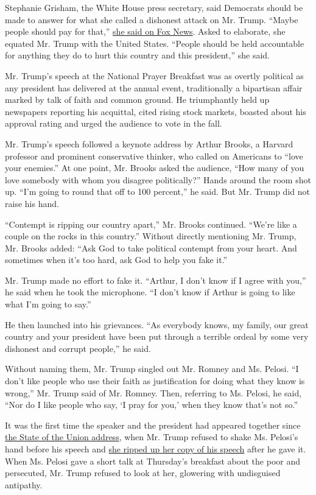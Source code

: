 Stephanie Grisham, the White House press secretary, said Democrats
should be made to answer for what she called a dishonest attack on Mr.
Trump. ``Maybe people should pay for that,''
\href{https://www.foxnews.com/media/stephanie-grisham-dems-must-be-held-accountable-for-corrupt-impeachment}{she
said on Fox News}. Asked to elaborate, she equated Mr. Trump with the
United States. ``People should be held accountable for anything they do
to hurt this country and this president,'' she said.

Mr. Trump's speech at the National Prayer Breakfast was as overtly
political as any president has delivered at the annual event,
traditionally a bipartisan affair marked by talk of faith and common
ground. He triumphantly held up newspapers reporting his acquittal,
cited rising stock markets, boasted about his approval rating and urged
the audience to vote in the fall.

Mr. Trump's speech followed a keynote address by Arthur Brooks, a
Harvard professor and prominent conservative thinker, who called on
Americans to ``love your enemies.'' At one point, Mr. Brooks asked the
audience, ``How many of you love somebody with whom you disagree
politically?'' Hands around the room shot up. ``I'm going to round that
off to 100 percent,'' he said. But Mr. Trump did not raise his hand.

``Contempt is ripping our country apart,'' Mr. Brooks continued. ``We're
like a couple on the rocks in this country.'' Without directly
mentioning Mr. Trump, Mr. Brooks added: ``Ask God to take political
contempt from your heart. And sometimes when it's too hard, ask God to
help you fake it.''

Mr. Trump made no effort to fake it. ``Arthur, I don't know if I agree
with you,'' he said when he took the microphone. ``I don't know if
Arthur is going to like what I'm going to say.''

He then launched into his grievances. ``As everybody knows, my family,
our great country and your president have been put through a terrible
ordeal by some very dishonest and corrupt people,'' he said.

Without naming them, Mr. Trump singled out Mr. Romney and Ms. Pelosi.
``I don't like people who use their faith as justification for doing
what they know is wrong,'' Mr. Trump said of Mr. Romney. Then, referring
to Ms. Pelosi, he said, ``Nor do I like people who say, `I pray for
you,' when they know that's not so.''

It was the first time the speaker and the president had appeared
together since
\href{https://www.nytimes.com/2020/02/05/us/politics/trump-state-of-the-union.html}{the
State of the Union address}, when Mr. Trump refused to shake Ms.
Pelosi's hand before his speech and
\href{https://www.nytimes.com/2020/02/05/us/politics/trump-pelosi.html}{she
ripped up her copy of his speech} after he gave it. When Ms. Pelosi gave
a short talk at Thursday's breakfast about the poor and persecuted, Mr.
Trump refused to look at her, glowering with undisguised antipathy.

